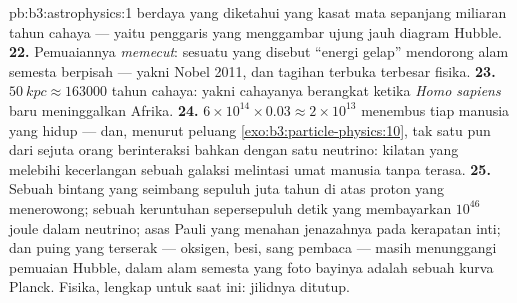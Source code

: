 \begin{solution}{pb:b3:astrophysics:1}
berdaya yang diketahui yang kasat mata sepanjang miliaran tahun cahaya ---
yaitu penggaris yang menggambar ujung jauh diagram Hubble.
\textbf{22.} Pemuaiannya \emph{memecut}: sesuatu yang disebut
``energi gelap'' mendorong alam semesta berpisah --- yakni Nobel 2011,
dan tagihan terbuka terbesar fisika.
\textbf{23.} $\qty{50}{kpc} \approx 163000$ tahun cahaya: yakni
cahayanya berangkat ketika \emph{Homo sapiens} baru meninggalkan Afrika.
\textbf{24.} $6\times10^{14}\times0.03 \approx 2\times10^{13}$
menembus tiap manusia yang hidup --- dan, menurut peluang
\cref{exo:b3:particle-physics:10}, tak satu pun dari sejuta orang
berinteraksi bahkan dengan satu neutrino: kilatan yang melebihi kecerlangan sebuah
galaksi melintasi umat manusia tanpa terasa.
\textbf{25.} Sebuah bintang yang seimbang sepuluh juta tahun di atas proton
yang menerowong; sebuah keruntuhan sepersepuluh detik yang membayarkan $10^{46}$
joule dalam neutrino; asas Pauli yang menahan jenazahnya pada
kerapatan inti; dan puing yang terserak --- oksigen, besi,
sang pembaca --- masih menunggangi pemuaian Hubble, dalam alam semesta yang
foto bayinya adalah sebuah kurva Planck. Fisika, lengkap untuk saat ini:
jilidnya ditutup.
\end{solution}
